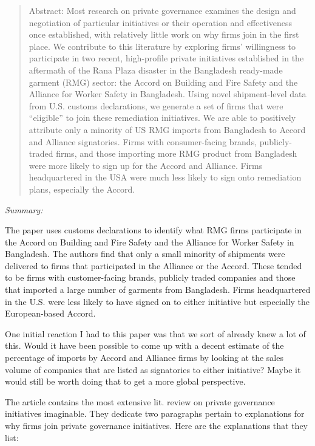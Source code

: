 \documentclass[
  12pt,
]{article}
\begin{document}

\begin{quote}
Abstract: 
Most research on private governance examines the design and negotiation of particular initiatives or their operation and effectiveness once established, with relatively little work on why firms join in the first place. We contribute to this literature by exploring firms' willingness to participate in two recent, high-profile private initiatives established in the aftermath of the Rana Plaza disaster in the Bangladesh ready-made garment (RMG) sector: the Accord on Building and Fire Safety and the Alliance for Worker Safety in Bangladesh. Using novel shipment-level data from U.S. customs declarations, we generate a set of firms that were ``eligible'' to join these remediation initiatives. We are able to positively attribute only a minority of US RMG imports from Bangladesh to Accord and Alliance signatories. Firms with consumer-facing brands, publicly-traded firms, and those importing more RMG product from Bangladesh were more likely to sign up for the Accord and Alliance. Firms headquartered in the USA were much less likely to sign onto remediation plans, especially the Accord.
\end{quote}

\emph{Summary:}

The paper uses customs declarations to identify what RMG firms
participate in the Accord on Building and Fire Safety and the Alliance
for Worker Safety in Bangladesh. The authors find that only a small
minority of shipments were delivered to firms that participated in the
Alliance or the Accord. These tended to be firms with customer-facing
brands, publicly traded companies and those that imported a large number
of garments from Bangladesh. Firms headquartered in the U.S. were less
likely to have signed on to either initiative but especially the
European-based Accord.

One initial reaction I had to this paper was that we sort of already
knew a lot of this. Would it have been possible to come up with a decent
estimate of the percentage of imports by Accord and Alliance firms by
looking at the sales volume of companies that are listed as signatories
to either initiative? Maybe it would still be worth doing that to get a
more global perspective.

The article contains the most extensive lit. review on private
governance initiatives imaginable. They dedicate two paragraphs pertain
to explanations for why firms join private governance initiatives. Here
are the explanations that they list:
\end{document}
